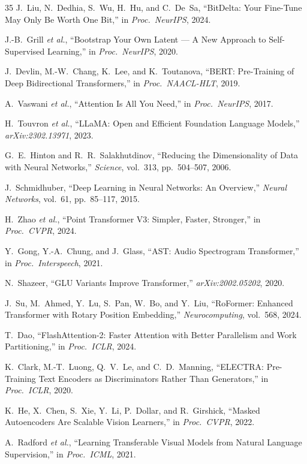 \documentclass[11pt,letterpaper]{article}
\begin{document}
\begin{thebibliography}{35}
J.~Liu, N.~Dedhia, S.~Wu, H.~Hu, and C.~De~Sa, ``BitDelta: Your Fine-Tune May Only Be Worth One Bit,'' in \emph{Proc.\ NeurIPS}, 2024.

J.-B.~Grill \emph{et al.}, ``Bootstrap Your Own Latent --- A New Approach to Self-Supervised Learning,'' in \emph{Proc.\ NeurIPS}, 2020.

J.~Devlin, M.-W.~Chang, K.~Lee, and K.~Toutanova, ``BERT: Pre-Training of Deep Bidirectional Transformers,'' in \emph{Proc.\ NAACL-HLT}, 2019.

A.~Vaswani \emph{et al.}, ``Attention Is All You Need,'' in \emph{Proc.\ NeurIPS}, 2017.

H.~Touvron \emph{et al.}, ``LLaMA: Open and Efficient Foundation Language Models,'' \emph{arXiv:2302.13971}, 2023.

G.~E.~Hinton and R.~R.~Salakhutdinov, ``Reducing the Dimensionality of Data with Neural Networks,'' \emph{Science}, vol.~313, pp.~504--507, 2006.

J.~Schmidhuber, ``Deep Learning in Neural Networks: An Overview,'' \emph{Neural Networks}, vol.~61, pp.~85--117, 2015.

H.~Zhao \emph{et al.}, ``Point Transformer V3: Simpler, Faster, Stronger,'' in \emph{Proc.\ CVPR}, 2024.

Y.~Gong, Y.-A.~Chung, and J.~Glass, ``AST: Audio Spectrogram Transformer,'' in \emph{Proc.\ Interspeech}, 2021.

N.~Shazeer, ``GLU Variants Improve Transformer,'' \emph{arXiv:2002.05202}, 2020.

J.~Su, M.~Ahmed, Y.~Lu, S.~Pan, W.~Bo, and Y.~Liu, ``RoFormer: Enhanced Transformer with Rotary Position Embedding,'' \emph{Neurocomputing}, vol.~568, 2024.

T.~Dao, ``FlashAttention-2: Faster Attention with Better Parallelism and Work Partitioning,'' in \emph{Proc.\ ICLR}, 2024.

K.~Clark, M.-T.~Luong, Q.~V.~Le, and C.~D.~Manning, ``ELECTRA: Pre-Training Text Encoders as Discriminators Rather Than Generators,'' in \emph{Proc.\ ICLR}, 2020.

K.~He, X.~Chen, S.~Xie, Y.~Li, P.~Dollar, and R.~Girshick, ``Masked Autoencoders Are Scalable Vision Learners,'' in \emph{Proc.\ CVPR}, 2022.

A.~Radford \emph{et al.}, ``Learning Transferable Visual Models from Natural Language Supervision,'' in \emph{Proc.\ ICML}, 2021.

\end{thebibliography}
\end{document}

